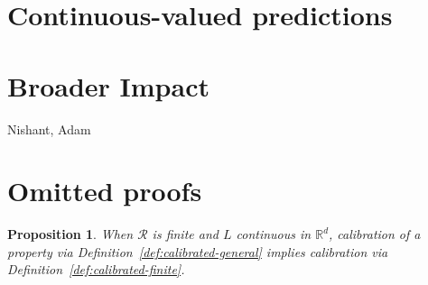\documentclass{article}
\newcommand{\reals}{\mathbb{R}}
\newcommand{\R}{\mathcal{R}}
\newtheorem{proposition}{Proposition}
\begin{document}
\section{Continuous-valued predictions}\label{sec:contin-consis}



\newpage

\section*{Broader Impact}

\begin{ack}
Nishant, Adam
\end{ack}




\newpage
\appendix
\section{Omitted proofs}
\begin{proposition}
	When $\R$ is finite and $L$ continuous in $\reals^d$, calibration of a property via Definition~\ref{def:calibrated-general} implies calibration via Definition~\ref{def:calibrated-finite}.
\end{proposition}
\end{document}

